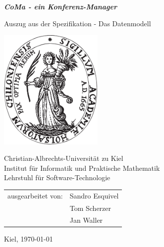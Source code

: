 \documentclass[a4paper, 12pt]{scrartcl}
\begin{document}
\thispagestyle{empty}
\begin{center}
{\huge \bf \emph{CoMa - ein Konferenz-Manager}}

\vspace{2cm}

{\Large Auszug aus der Spezifikation - Das Datenmodell}

\vspace{2.25cm}

\includegraphics[width=5cm]{causiegel}

\vspace{2.25cm}

{\large
{\sc Christian-Albrechts-Universit\"{a}t zu Kiel} \\
Institut f\"{u}r Informatik und Praktische Mathematik \\
Lehrstuhl f\"{u}r Software-Technologie }

\vspace{2cm}

\begin{tabular}{ll}
ausgearbeitet von:           & {Sandro Esquivel} \\
                             & {Tom Scherzer} \\
                             & {Jan Waller} \\
\end{tabular}

\vspace{1cm}

Kiel, \today
\end{center}

\pagebreak

\end{document}
